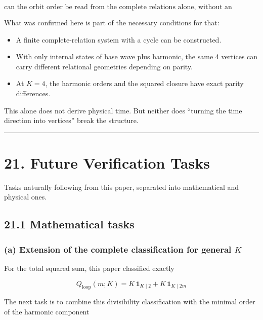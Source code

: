 \documentclass[
  a4paper,
]{article}
\providecommand{\tightlist}{%
  \setlength{\itemsep}{0pt}\setlength{\parskip}{0pt}}
\begin{document}
\[
\boxed{
\text{can the orbit order be read from the complete relations alone, without an external update variable?}
}
\]

What was confirmed here is part of the necessary conditions for that:

\begin{itemize}
\tightlist
\item
  A finite complete-relation system with a cycle can be constructed.
\item
  With only internal states of base wave plus harmonic, the same 4
  vertices can carry different relational geometries depending on
  parity.
\item
  At \(K=4\), the harmonic orders and the squared closure have exact
  parity differences.
\end{itemize}

This alone does not derive physical time. But neither does ``turning the
time direction into vertices'' break the structure.

\begin{center}\rule{0.5\linewidth}{0.5pt}\end{center}

\section{21. Future Verification Tasks}\label{future-verification-tasks}

Tasks naturally following from this paper, separated into mathematical
and physical ones.

\subsection{21.1 Mathematical tasks}\label{mathematical-tasks}

\subsubsection{\texorpdfstring{(a) Extension of the complete
classification for general
\(K\)}{(a) Extension of the complete classification for general K}}\label{a-extension-of-the-complete-classification-for-general-k}

For the total squared sum, this paper classified exactly

\[
Q_{\mathrm{loop}}(m;K)
=
K\,\mathbf 1_{K\mid2}
+
K\,\mathbf 1_{K\mid2m}
\]

The next task is to combine this divisibility classification with the
minimal order of the harmonic component
\end{document}
